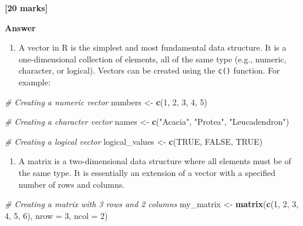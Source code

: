 \documentclass[
  10t,
]{article}
\newenvironment{Shaded}{\begin{snugshade}}{\end{snugshade}}
\newcommand{\AttributeTok}[1]{\textcolor[rgb]{0.13,0.29,0.53}{#1}}
\newcommand{\CommentTok}[1]{\textcolor[rgb]{0.56,0.35,0.01}{\textit{#1}}}
\newcommand{\ConstantTok}[1]{\textcolor[rgb]{0.56,0.35,0.01}{#1}}
\newcommand{\DecValTok}[1]{\textcolor[rgb]{0.00,0.00,0.81}{#1}}
\newcommand{\FunctionTok}[1]{\textcolor[rgb]{0.13,0.29,0.53}{\textbf{#1}}}
\newcommand{\NormalTok}[1]{#1}
\newcommand{\OtherTok}[1]{\textcolor[rgb]{0.56,0.35,0.01}{#1}}
\newcommand{\StringTok}[1]{\textcolor[rgb]{0.31,0.60,0.02}{#1}}
\providecommand{\tightlist}{%
  \setlength{\itemsep}{0pt}\setlength{\parskip}{0pt}}
\let\oldtexttt\texttt
\renewcommand{\texttt}[1]{\oldtexttt{\small #1}}
\begin{document}
\textbf{{[}20 marks{]}}

\textbf{Answer}

\begin{enumerate}
\def\labelenumi{(\alph{enumi})}
\tightlist
\item
  A vector in R is the simplest and most fundamental data structure. It
  is a one-dimensional collection of elements, all of the same type
  (e.g., numeric, character, or logical). Vectors can be created using
  the \texttt{c()} function. For example:
\end{enumerate}

\begin{Shaded}
\begin{Highlighting}[]
\CommentTok{\# Creating a numeric vector}
\NormalTok{numbers }\OtherTok{\textless{}{-}} \FunctionTok{c}\NormalTok{(}\DecValTok{1}\NormalTok{, }\DecValTok{2}\NormalTok{, }\DecValTok{3}\NormalTok{, }\DecValTok{4}\NormalTok{, }\DecValTok{5}\NormalTok{)}

\CommentTok{\# Creating a character vector}
\NormalTok{names }\OtherTok{\textless{}{-}} \FunctionTok{c}\NormalTok{(}\StringTok{"Acacia"}\NormalTok{, }\StringTok{"Protea"}\NormalTok{, }\StringTok{"Leucadendron"}\NormalTok{)}

\CommentTok{\# Creating a logical vector}
\NormalTok{logical\_values }\OtherTok{\textless{}{-}} \FunctionTok{c}\NormalTok{(}\ConstantTok{TRUE}\NormalTok{, }\ConstantTok{FALSE}\NormalTok{, }\ConstantTok{TRUE}\NormalTok{)}
\end{Highlighting}
\end{Shaded}

\begin{enumerate}
\def\labelenumi{(\alph{enumi})}
\setcounter{enumi}{1}
\tightlist
\item
  A matrix is a two-dimensional data structure where all elements must
  be of the same type. It is essentially an extension of a vector with a
  specified number of rows and columns.
\end{enumerate}

\begin{Shaded}
\begin{Highlighting}[]
\CommentTok{\# Creating a matrix with 3 rows and 2 columns}
\NormalTok{my\_matrix }\OtherTok{\textless{}{-}} \FunctionTok{matrix}\NormalTok{(}\FunctionTok{c}\NormalTok{(}\DecValTok{1}\NormalTok{, }\DecValTok{2}\NormalTok{, }\DecValTok{3}\NormalTok{, }\DecValTok{4}\NormalTok{, }\DecValTok{5}\NormalTok{, }\DecValTok{6}\NormalTok{), }\AttributeTok{nrow =} \DecValTok{3}\NormalTok{, }\AttributeTok{ncol =} \DecValTok{2}\NormalTok{)}
\end{Highlighting}
\end{Shaded}
\end{document}
